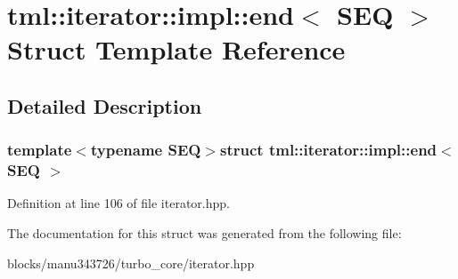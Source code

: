 \hypertarget{structtml_1_1iterator_1_1impl_1_1end}{\section{tml\+:\+:iterator\+:\+:impl\+:\+:end$<$ S\+E\+Q $>$ Struct Template Reference}
\label{structtml_1_1iterator_1_1impl_1_1end}
}


\subsection{Detailed Description}
\subsubsection*{template$<$typename S\+E\+Q$>$struct tml\+::iterator\+::impl\+::end$<$ S\+E\+Q $>$}



Definition at line 106 of file iterator.\+hpp.



The documentation for this struct was generated from the following file\+:\begin{DoxyCompactItemize}
\item 
blocks/manu343726/turbo\+\_\+core/iterator.\+hpp\end{DoxyCompactItemize}

